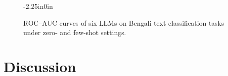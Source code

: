 \documentclass[10pt,letterpaper]{article}
\begin{document}
\begin{figure}[!t]
\begin{adjustwidth}{-2.25in}{0in}
\centering

\hfill
{}
\hfill
{}

\vspace{0.35cm}

\hfill
{}
\hfill
{}

\vspace{0.35cm}


\caption{ROC--AUC curves of six LLMs on Bengali text classification tasks under zero- and few-shot settings.}
\label{fig:roc_auc_analysis}
\end{adjustwidth}
\end{figure}


\section*{Discussion}
\label{sec:discussion}
\end{document}
